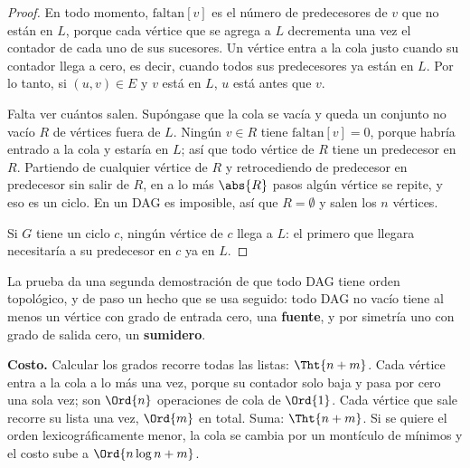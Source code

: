 \documentclass[11pt,letterpaper]{article}
\begin{document}
\begin{proof}
  En todo momento, $\text{faltan}[v]$ es el número de predecesores de
  $v$ que no están en $L$, porque cada vértice que se agrega a $L$
  decrementa una vez el contador de cada uno de sus sucesores. Un
  vértice entra a la cola justo cuando su contador llega a cero, es
  decir, cuando todos sus predecesores ya están en $L$. Por lo tanto,
  si $(u, v) \in E$ y $v$ está en $L$, $u$ está antes que $v$.

  Falta ver cuántos salen. Supóngase que la cola se vacía y queda un
  conjunto no vacío $R$ de vértices fuera de $L$. Ningún $v \in R$
  tiene $\text{faltan}[v] = 0$, porque habría entrado a la cola y
  estaría en $L$; así que todo vértice de $R$ tiene un predecesor en
  $R$. Partiendo de cualquier vértice de $R$ y retrocediendo de
  predecesor en predecesor sin salir de $R$, en a lo más $\abs{R}$
  pasos algún vértice se repite, y eso es un ciclo. En un DAG es
  imposible, así que $R = \emptyset$ y salen los $n$ vértices.

  Si $G$ tiene un ciclo $c$, ningún vértice de $c$ llega a $L$: el
  primero que llegara necesitaría a su predecesor en $c$ ya en $L$.
\end{proof}

La prueba da una segunda demostración de que todo DAG tiene orden
topológico, y de paso un hecho que se usa seguido: todo DAG no vacío
tiene al menos un vértice con grado de entrada cero, una
\textbf{fuente}, y por simetría uno con grado de salida cero, un
\textbf{sumidero}.

\textbf{Costo.} Calcular los grados recorre todas las listas:
$\Tht{n + m}$. Cada vértice entra a la cola a lo más una vez, porque su
contador solo baja y pasa por cero una sola vez; son $\Ord{n}$
operaciones de cola de $\Ord{1}$. Cada vértice que sale recorre su
lista una vez, $\Ord{m}$ en total. Suma: $\Tht{n + m}$. Si se quiere el
orden lexicográficamente menor, la cola se cambia por un montículo de
mínimos y el costo sube a $\Ord{n \log n + m}$.
\end{document}
